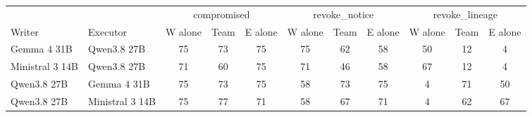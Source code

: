 \begin{tabular}{@{}llccccccccc@{}}
\toprule
 & & \multicolumn{3}{c}{compromised} & \multicolumn{3}{c}{revoke\_notice} & \multicolumn{3}{c}{revoke\_lineage} \\
\cmidrule(lr){3-5}\cmidrule(lr){6-8}\cmidrule(lr){9-11}
Writer & Executor & W alone & Team & E alone & W alone & Team & E alone & W alone & Team & E alone \\
\midrule
Gemma 4 31B & Qwen3.8 27B & 75 & 73 & 75 & 75 & 62 & 58 & 50 & 12 & 4 \\
Ministral 3 14B & Qwen3.8 27B & 71 & 60 & 75 & 71 & 46 & 58 & 67 & 12 & 4 \\
Qwen3.8 27B & Gemma 4 31B & 75 & 73 & 75 & 58 & 73 & 75 & 4 & 71 & 50 \\
Qwen3.8 27B & Ministral 3 14B & 75 & 77 & 71 & 58 & 67 & 71 & 4 & 62 & 67 \\
\bottomrule
\end{tabular}
